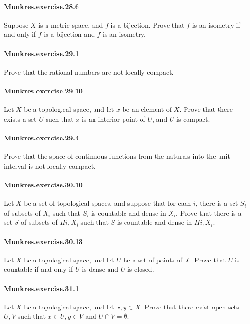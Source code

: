 \documentclass{article}
\begin{document}
\paragraph{Munkres.exercise.28.6} Suppose $X$ is a metric space, and $f$ is a bijection. Prove that $f$ is an isometry if and only if $f$ is a bijection and $f$ is an isometry.

\paragraph{Munkres.exercise.29.1} Prove that the rational numbers are not locally compact.

\paragraph{Munkres.exercise.29.10} Let $X$ be a topological space, and let $x$ be an element of $X$. Prove that there exists a set $U$ such that $x$ is an interior point of $U$, and $U$ is compact.

\paragraph{Munkres.exercise.29.4} Prove that the space of continuous functions from the naturals into the unit interval is not locally compact.

\paragraph{Munkres.exercise.30.10} Let $X$ be a set of topological spaces, and suppose that for each $i$, there is a set $S_i$ of subsets of $X_i$ such that $S_i$ is countable and dense in $X_i$. Prove that there is a set $S$ of subsets of $\Pi i, X_i$ such that $S$ is countable and dense in $\Pi i, X_i$.

\paragraph{Munkres.exercise.30.13} Let $X$ be a topological space, and let $U$ be a set of points of $X$. Prove that $U$ is countable if and only if $U$ is dense and $U$ is closed.

\paragraph{Munkres.exercise.31.1} Let $X$ be a topological space, and let $x, y \in X$. Prove that there exist open sets $U, V$ such that $x \in U, y \in V$ and $U \cap V = \emptyset$.
\end{document}

